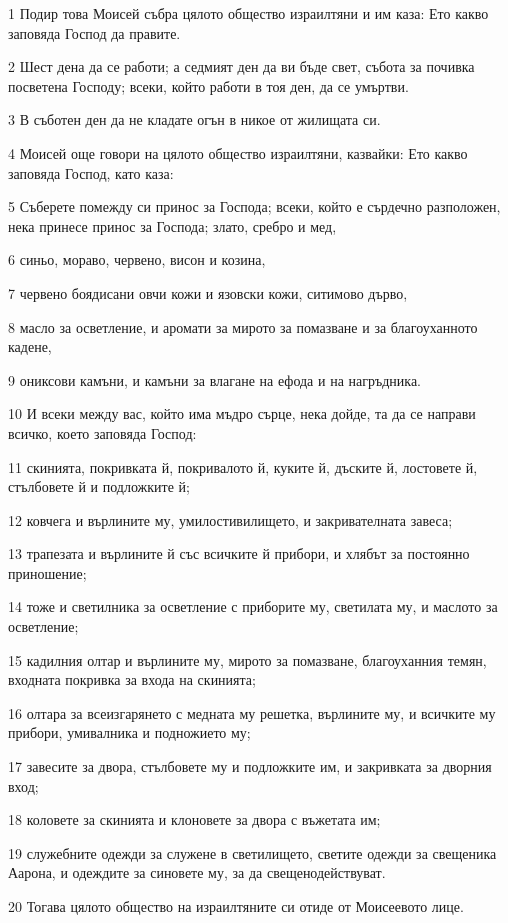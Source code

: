 \par 1 Подир това Моисей събра цялото общество израилтяни и им каза: Ето какво заповяда Господ да правите.
\par 2 Шест дена да се работи; а седмият ден да ви бъде свет, събота за почивка посветена Господу; всеки, който работи в тоя ден, да се умъртви.
\par 3 В съботен ден да не кладате огън в никое от жилищата си.
\par 4 Моисей още говори на цялото общество израилтяни, казвайки: Ето какво заповяда Господ, като каза:
\par 5 Съберете помежду си принос за Господа; всеки, който е сърдечно разположен, нека принесе принос за Господа; злато, сребро и мед,
\par 6 синьо, мораво, червено, висон и козина,
\par 7 червено боядисани овчи кожи и язовски кожи, ситимово дърво,
\par 8 масло за осветление, и аромати за мирото за помазване и за благоуханното кадене,
\par 9 ониксови камъни, и камъни за влагане на ефода и на нагръдника.
\par 10 И всеки между вас, който има мъдро сърце, нека дойде, та да се направи всичко, което заповяда Господ:
\par 11 скинията, покривката й, покривалото й, куките й, дъските й, лостовете й, стълбовете й и подложките й;
\par 12 ковчега и върлините му, умилостивилището, и закривателната завеса;
\par 13 трапезата и върлините й със всичките й прибори, и хлябът за постоянно приношение;
\par 14 тоже и светилника за осветление с приборите му, светилата му, и маслото за осветление;
\par 15 кадилния олтар и върлините му, мирото за помазване, благоуханния темян, входната покривка за входа на скинията;
\par 16 олтара за всеизгарянето с медната му решетка, върлините му, и всичките му прибори, умивалника и подножието му;
\par 17 завесите за двора, стълбовете му и подложките им, и закривката за дворния вход;
\par 18 коловете за скинията и клоновете за двора с въжетата им;
\par 19 служебните одежди за служене в светилището, светите одежди за свещеника Аарона, и одеждите за синовете му, за да свещенодействуват.
\par 20 Тогава цялото общество на израилтяните си отиде от Моисеевото лице.
